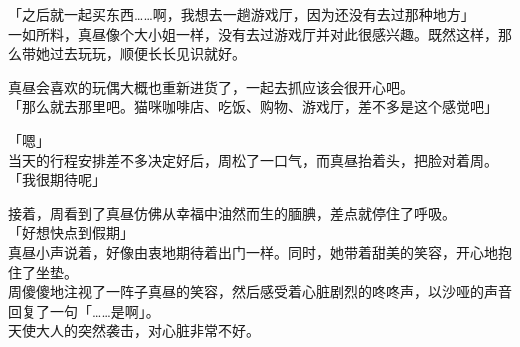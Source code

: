 「之后就一起买东西……啊，我想去一趟游戏厅，因为还没有去过那种地方」\\

一如所料，真昼像个大小姐一样，没有去过游戏厅并对此很感兴趣。既然这样，那么带她过去玩玩，顺便长长见识就好。

真昼会喜欢的玩偶大概也重新进货了，一起去抓应该会很开心吧。\\

「那么就去那里吧。猫咪咖啡店、吃饭、购物、游戏厅，差不多是这个感觉吧」

「嗯」\\

当天的行程安排差不多决定好后，周松了一口气，而真昼抬着头，把脸对着周。\\

「我很期待呢」

接着，周看到了真昼仿佛从幸福中油然而生的腼腆，差点就停住了呼吸。\\%

「好想快点到假期」\\

真昼小声说着，好像由衷地期待着出门一样。同时，她带着甜美的笑容，开心地抱住了坐垫。\\

周傻傻地注视了一阵子真昼的笑容，然后感受着心脏剧烈的咚咚声，以沙哑的声音回复了一句「……是啊」。\\

天使大人的突然袭击，对心脏非常不好。

